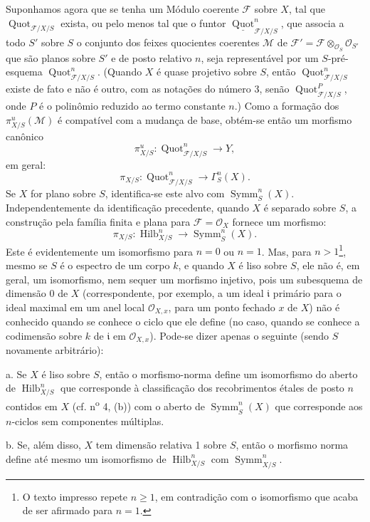 \documentclass[11pt,twoside,openany]{book}
\numberwithin{equation}{section}
\newcommand{\src}[1]{%
  \phantomsection\hypertarget{src:#1}{}%
  \marginpar{\raggedleft\footnotesize\sffamily #1}%
}
\theoremstyle{plain}
\theoremstyle{definition}
\theoremstyle{remark}
\newcommand{\FgaUnitKey}{frontmatter}
\renewcommand{\src}[1]{%
  \phantomsection\hypertarget{src:\FgaUnitKey:#1}{}%
  \marginpar{\raggedleft\footnotesize\sffamily #1}%
}
\begin{document}
Suponhamos agora que se tenha um Módulo coerente $\mathcal F$ sobre $X$, tal
que $\operatorname{Quot}_{\mathcal F/X/S}$ exista, ou pelo menos tal que o
funtor $\underline{\operatorname{Quot}}^n_{\mathcal F/X/S}$, que associa a
todo $S'$ sobre $S$ o conjunto dos feixes quocientes coerentes $\mathcal M$ de
$\mathcal F'=\mathcal F\otimes_{\mathcal O_S}\mathcal O_{S'}$ que são planos
sobre $S'$ e de posto relativo $n$, seja representável por um $S$-pré-esquema
$\operatorname{Quot}^n_{\mathcal F/X/S}$. (Quando $X$ é quase projetivo sobre
$S$, então $\operatorname{Quot}^n_{\mathcal F/X/S}$ existe de fato e não é
outro, com as notações do número 3, senão
$\operatorname{Quot}^P_{\mathcal F/X/S}$, onde $P$ é o polinômio reduzido ao
termo constante $n$.) Como a formação dos $\pi^u_{X/S}(\mathcal M)$ é
compatível com a mudança de base, obtém-se então um morfismo canônico
\[
\pi^u_{X/S}:\operatorname{Quot}^n_{\mathcal F/X/S}\longrightarrow Y,
\]
em geral:
\[
\pi_{X/S}:\operatorname{Quot}^n_{\mathcal F/X/S}
\longrightarrow\Gamma^n_S(X).
\]
Se $X$ for plano sobre $S$, identifica-se este alvo com $\operatorname{Symm}^n_S(X)$.
Independentemente da identificação precedente, quando $X$ é separado sobre $S$, a construção pela família finita e plana para $\mathcal F=\mathcal O_X$ fornece um morfismo:
\[
\pi_{X/S}:\operatorname{Hilb}^n_{X/S}
\longrightarrow\operatorname{Symm}^n_S(X).
\]
Este é evidentemente um isomorfismo para $n=0$ ou $n=1$. Mas, para
$n>1$\footnote{O texto impresso repete $n\geq1$, em contradição com o
isomorfismo que acaba de ser afirmado para $n=1$.}, mesmo se $S$ é o espectro
de um corpo $k$, e quando $X$ é liso sobre $S$, ele não é, em geral, um
isomorfismo, nem sequer um morfismo injetivo, pois um subesquema de dimensão 0
de $X$ (correspondente, por exemplo, a um ideal $\mathfrak i$ primário para o
ideal maximal em um anel local $\mathcal O_{X,x}$, para um ponto fechado $x$ de
$X$) não é conhecido quando se conhece o ciclo que ele define (no caso, quando
se conhece a codimensão sobre $k$ de $\mathfrak i$ em $\mathcal O_{X,x}$).
Pode-se dizer apenas o seguinte (sendo $S$ novamente arbitrário):

\medskip
\noindent a. Se $X$ é liso sobre $S$, então o morfismo-norma define um
isomorfismo do aberto de $\operatorname{Hilb}^n_{X/S}$ que corresponde à
classificação dos recobrimentos étales de posto $n$ contidos em $X$ (cf.
n\textsuperscript{o} 4, (b)) com o aberto de
$\operatorname{Symm}^n_S(X)$ que corresponde aos $n$-ciclos sem componentes
múltiplas.
\src{275}

\medskip
\noindent b. Se, além disso, $X$ tem dimensão relativa 1 sobre $S$, então o
morfismo norma define até mesmo um isomorfismo de
$\operatorname{Hilb}^n_{X/S}$ com $\operatorname{Symm}^n_{X/S}$.
\end{document}

